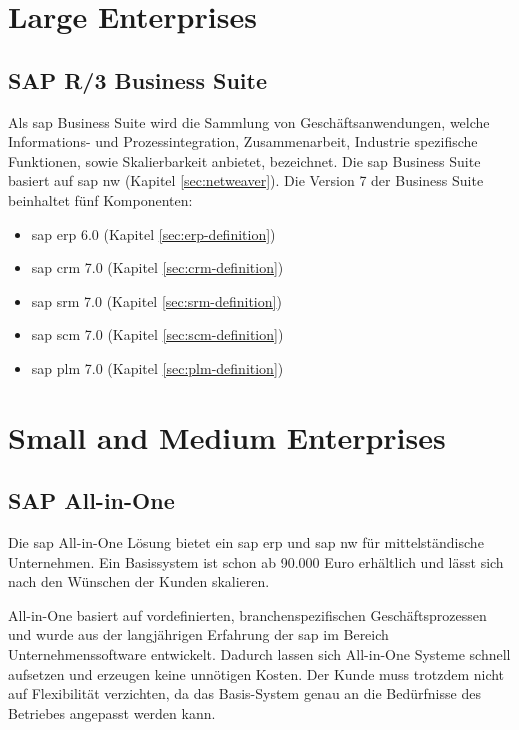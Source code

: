 \section{Large Enterprises}
\subsection{SAP R/3 Business Suite}
\label{sec:business-suite}
Als \gls{sap} Business Suite wird die Sammlung von Geschäftsanwendungen, welche Informations- und Prozessintegration, Zusammenarbeit, Industrie spezifische Funktionen, sowie Skalierbarkeit anbietet, bezeichnet. Die \gls{sap} Business Suite basiert auf \gls{sap} \gls{nw} (Kapitel \ref{sec:netweaver}).
Die Version 7 der Business Suite beinhaltet fünf Komponenten:

\begin{itemize}
	\item \gls{sap} \gls{erp} 6.0 (Kapitel \ref{sec:erp-definition})
	\item \gls{sap} \gls{crm} 7.0 (Kapitel \ref{sec:crm-definition})
	\item \gls{sap} \gls{srm} 7.0 (Kapitel \ref{sec:srm-definition})
	\item \gls{sap} \gls{scm} 7.0 (Kapitel \ref{sec:scm-definition})
	\item \gls{sap} \gls{plm} 7.0 (Kapitel \ref{sec:plm-definition})
\end{itemize}

\cite{SAPNews}

\section{Small and Medium Enterprises}
\subsection{SAP All-in-One}
\label{sec:allinone}

Die \gls{sap} All-in-One Lösung bietet ein \gls{sap} \gls{erp} und \gls{sap} \gls{nw} für mittelständische Unternehmen. Ein Basissystem ist schon ab 90.000 Euro erhältlich und lässt sich nach den Wünschen der Kunden skalieren.

All-in-One basiert auf vordefinierten, branchenspezifischen Geschäftsprozessen und wurde aus der langjährigen Erfahrung der \gls{sap} im Bereich Unternehmenssoftware entwickelt. Dadurch lassen sich All-in-One Systeme schnell aufsetzen und erzeugen keine unnötigen Kosten. Der Kunde muss trotzdem nicht auf Flexibilität verzichten, da das Basis-System genau an die Bedürfnisse des Betriebes angepasst werden kann.

